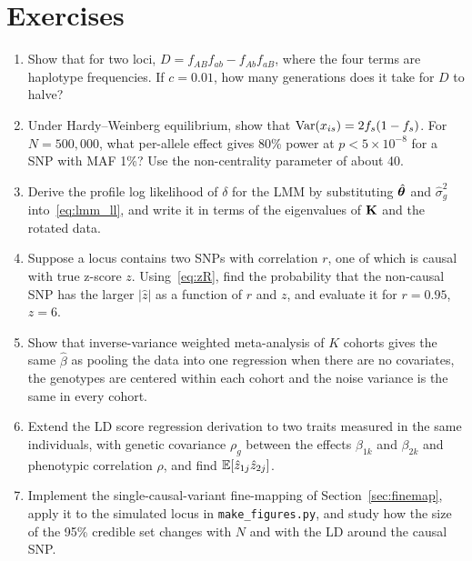 \section*{Exercises}

\begin{enumerate}
  \item Show that for two loci, $D=f_{AB}f_{ab}-f_{Ab}f_{aB}$, where the four terms are haplotype frequencies. If $c=0.01$, how many generations does it take for $D$ to halve?
  \item Under Hardy--Weinberg equilibrium, show that $\operatorname{Var}(x_{is})=2f_s(1-f_s)$. For $N=500{,}000$, what per-allele effect gives 80\% power at $p<5\times10^{-8}$ for a SNP with MAF 1\%? Use the non-centrality parameter of about 40.
  \item Derive the profile log likelihood of $\delta$ for the LMM by substituting $\hat{\boldsymbol{\theta}}$ and $\hat\sigma_g^2$ into~\eqref{eq:lmm_ll}, and write it in terms of the eigenvalues of $\mathbf{K}$ and the rotated data.
  \item Suppose a locus contains two SNPs with correlation $r$, one of which is causal with true z-score $z$. Using~\eqref{eq:zR}, find the probability that the non-causal SNP has the larger $|\hat z|$ as a function of $r$ and $z$, and evaluate it for $r=0.95$, $z=6$.
  \item Show that inverse-variance weighted meta-analysis of $K$ cohorts gives the same $\hat\beta$ as pooling the data into one regression when there are no covariates, the genotypes are centered within each cohort and the noise variance is the same in every cohort.
  \item Extend the LD score regression derivation to two traits measured in the same individuals, with genetic covariance $\rho_g$ between the effects $\beta_{1k}$ and $\beta_{2k}$ and phenotypic correlation $\rho$, and find $\mathbb{E}[\hat z_{1j}\hat z_{2j}]$.
  \item Implement the single-causal-variant fine-mapping of Section~\ref{sec:finemap}, apply it to the simulated locus in \texttt{make\_figures.py}, and study how the size of the 95\% credible set changes with $N$ and with the LD around the causal SNP.
\end{enumerate}
